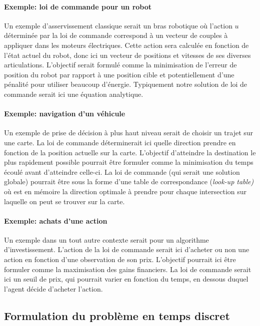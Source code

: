 \paragraph{Exemple: loi de commande pour un robot}

Un exemple d'asservissement classique serait un bras robotique où l'action $u$ déterminée par la loi de commande correspond à un vecteur de couples à appliquer dans les moteurs électriques. Cette action sera calculée en fonction de l'état actuel du robot, donc ici un vecteur de positions et vitesses de ses diverses articulations. L'objectif serait formulé comme la minimisation de l'erreur de position du robot par rapport à une position cible et potentiellement d'une pénalité pour utiliser beaucoup d'énergie. Typiquement notre solution de loi de commande serait ici une équation analytique.

\paragraph{Exemple: navigation d'un véhicule}

Un exemple de prise de décision à plus haut niveau serait de choisir un trajet sur une carte. La loi de commande déterminerait ici quelle direction prendre en fonction de la position actuelle sur la carte. L'objectif d'atteindre la destination le plus rapidement possible pourrait être formuler comme la minimisation du temps écoulé avant d'atteindre celle-ci. La loi de commande (qui serait une solution globale) pourrait être sous la forme d'une table de correspondance (\textit{look-up table)} où est en mémoire la direction optimale à prendre pour chaque intersection sur laquelle on peut se trouver sur la carte.

\paragraph{Exemple: achats d'une action}

Un exemple dans un tout autre contexte serait pour un algorithme d'investissement. L'action de la loi de commande serait ici d'acheter ou non une action en fonction d'une observation de son prix. L'objectif pourrait ici être formuler comme la maximisation des gains financiers. La loi de commande serait ici un seuil de prix, qui pourrait varier en fonction du temps, en dessous duquel l'agent décide d'acheter l'action.


\newpage
\subsection{Formulation du problème en temps discret}


